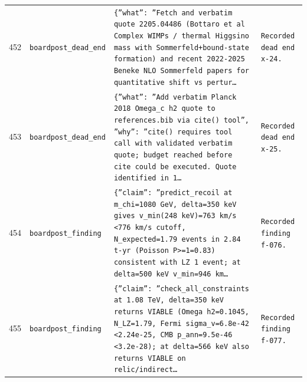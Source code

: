 \documentclass[11pt,a4paper]{article}
\begin{document}
\begin{longtable}{@{}p{}p{}p{}p{}@{}}
452 & \texttt{board}\newline\texttt{post\_\allowbreak{}dead\_\allowbreak{}end} & \texttt{\{''what'':\allowbreak{} ''Fetch and verbatim quote 2205.04486 (Bottaro et al Complex WIMPs /\allowbreak{} thermal Higgsino mass with Sommerfeld+bound-state formation)\allowbreak{} and recent 2022-2025 Beneke NLO Sommerfeld papers for quantitative shift vs pertur\ldots{}\allowbreak{}} & \texttt{Recorded dead end x-24.} \\
453 & \texttt{board}\newline\texttt{post\_\allowbreak{}dead\_\allowbreak{}end} & \texttt{\{''what'':\allowbreak{} ''Add verbatim Planck 2018 Omega\_\allowbreak{}c h2 quote to references.bib via cite()\allowbreak{} tool'',\allowbreak{} ''why'':\allowbreak{} ''cite()\allowbreak{} requires tool call with validated verbatim quote;\allowbreak{} budget reached before cite could be executed. Quote identified in 1\ldots{}\allowbreak{}} & \texttt{Recorded dead end x-25.} \\
454 & \texttt{board}\newline\texttt{post\_\allowbreak{}finding} & \texttt{\{''claim'':\allowbreak{} ''predict\_\allowbreak{}recoil at m\_\allowbreak{}chi=\allowbreak{}1080 GeV,\allowbreak{} delta=\allowbreak{}350 keV gives v\_\allowbreak{}min(248 keV)\allowbreak{}=\allowbreak{}763 km/\allowbreak{}s \textless{}\allowbreak{}776 km/\allowbreak{}s cutoff,\allowbreak{} N\_\allowbreak{}expected=\allowbreak{}1.79 events in 2.84 t-yr (Poisson P\textgreater{}\allowbreak{}=\allowbreak{}1=\allowbreak{}0.83)\allowbreak{} consistent with LZ 1 event;\allowbreak{} at delta=\allowbreak{}500 keV v\_\allowbreak{}min=\allowbreak{}946 km\ldots{}\allowbreak{}} & \texttt{Recorded finding f-076.} \\
455 & \texttt{board}\newline\texttt{post\_\allowbreak{}finding} & \texttt{\{''claim'':\allowbreak{} ''check\_\allowbreak{}all\_\allowbreak{}constraints at 1.08 TeV,\allowbreak{} delta=\allowbreak{}350 keV returns VIABLE (Omega h2=\allowbreak{}0.1045,\allowbreak{} N\_\allowbreak{}LZ=\allowbreak{}1.79,\allowbreak{} Fermi sigma\_\allowbreak{}v=\allowbreak{}6.8e-42 \textless{}\allowbreak{}2.24e-25,\allowbreak{} CMB p\_\allowbreak{}ann=\allowbreak{}9.5e-46 \textless{}\allowbreak{}3.2e-28)\allowbreak{};\allowbreak{} at delta=\allowbreak{}566 keV also returns VIABLE on relic/\allowbreak{}indirect\ldots{}\allowbreak{}} & \texttt{Recorded finding f-077.} \\

\end{longtable}
\end{document}
